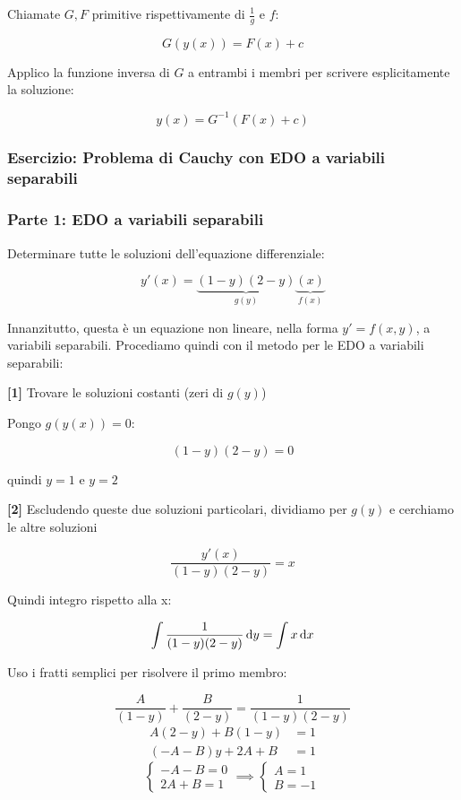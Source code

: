 \filbreak{}

Chiamate \(G, F\) primitive rispettivamente di \(\frac{1}{g}\) e \(f\):

\[
    G(y(x)) = F(x) + c
\]

Applico la funzione inversa di \(G\) a entrambi i membri per scrivere esplicitamente la soluzione:

\[
    y(x) = G^{-1} (F(x) + c)
\]

\subsubsection{Esercizio: Problema di Cauchy con EDO a variabili separabili}

\subsubsection*{Parte 1: EDO a variabili separabili}

Determinare tutte le soluzioni dell'equazione differenziale:

\[
    y'(x) = \underbrace{(1-y)(2-y)}_{g(y)}\underbrace{(x)}_{f(x)}
\]

Innanzitutto, questa è un equazione non lineare, nella forma \(y'=f(x,y)\), a variabili separabili.
Procediamo quindi con il metodo per le EDO a variabili separabili:

\vspace{0.4cm}
\textbf{[1]} Trovare le soluzioni costanti (zeri di \(g(y)\))

Pongo \(g(y(x)) = 0\):

\[
    (1-y)(2-y) = 0
\]

quindi \(y=1\) e \(y=2\)

\vspace{0.4cm}
\textbf{[2]} Escludendo queste due soluzioni particolari, dividiamo per \(g(y)\) e cerchiamo le altre soluzioni

\[
    \frac{y'(x)}{(1-y)(2-y)} = x
\]

Quindi integro rispetto alla x:

\[
    \int \frac{1}{(1-y)(2-y)} \mathop{}\!\mathrm{d} y = \int x \mathop{}\!\mathrm{d} x
\]

Uso i fratti semplici per risolvere il primo membro:

\[
    \frac{A}{(1-y)} + \frac{B}{(2-y)} = \frac{1}{(1-y)(2-y)}
\]
\vspace{-0.5cm}\begin{align*}
    A(2-y) + B(1-y)  & = 1 \\
    (-A-B)y + 2A + B & = 1
\end{align*}
\begin{equation*}
    \begin{cases}
        -A -B = 0 \\
        2A +B = 1
    \end{cases}
    \implies
    \begin{cases}
        A = 1 \\
        B = -1
    \end{cases}
\end{equation*}

